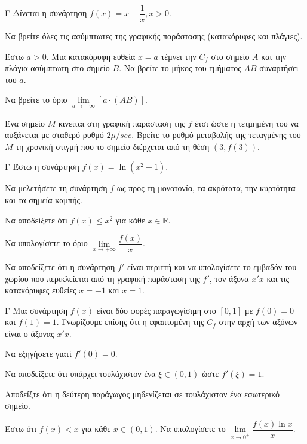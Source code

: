 \begin{thema}{Γ}
Δίνεται η συνάρτηση $f(x) = x + \dfrac{1}{x}, x > 0$.
\begin{erwthma}
  \item Να βρείτε όλες τις ασύμπτωτες της γραφικής παράστασης (κατακόρυφες και πλάγιες).
  \item Έστω $a > 0$. Μια κατακόρυφη ευθεία $x = a$ τέμνει την $C_f$ στο σημείο $A$ και την πλάγια ασύμπτωτη στο σημείο $B$. Να βρείτε το μήκος του τμήματος $AB$ συναρτήσει του $a$.
  \item Να βρείτε το όριο $\lim\limits_{a \to +\infty} [a \cdot (AB)]$.
  \item Ένα σημείο $M$ κινείται στη γραφική παράσταση της $f$ έτσι ώστε η τετμημένη του να αυξάνεται με σταθερό ρυθμό $2\mu/\si{sec}$. Βρείτε το ρυθμό μεταβολής της τεταγμένης του $M$ τη χρονική στιγμή που το σημείο διέρχεται από τη θέση $(3,f(3))$.
\end{erwthma}
\end{thema}

\begin{thema}{Γ}
Έστω η συνάρτηση $f(x) = \ln(x^2 + 1)$.
\begin{erwthma}
  \item Να μελετήσετε τη συνάρτηση $f$ ως προς τη μονοτονία, τα ακρότατα, την κυρτότητα και τα σημεία καμπής.
  \item Να αποδείξετε ότι $f(x) \le x^2$ για κάθε $x \in \mathbb{R}$.
  \item Να υπολογίσετε το όριο $\lim\limits_{x \to +\infty} \dfrac{f(x)}{x}$.
  \item Να αποδείξετε ότι η συνάρτηση $f'$ είναι περιττή και να υπολογίσετε το εμβαδόν του χωρίου που περικλείεται από τη γραφική παράσταση της $f'$, τον άξονα $x'x$ και τις κατακόρυφες ευθείες $x=-1$ και $x=1$.
\end{erwthma}
\end{thema}

\begin{thema}{Γ}
Μια συνάρτηση $f(x)$ είναι δύο φορές παραγωγίσιμη στο $[0, 1]$ με $f(0)=0$ και $f(1)=1$. Γνωρίζουμε επίσης ότι η εφαπτομένη της $C_f$ στην αρχή των αξόνων είναι ο άξονας $x'x$.
\begin{erwthma}
  \item Να εξηγήσετε γιατί $f'(0) = 0$.
  \item Να αποδείξετε ότι υπάρχει τουλάχιστον ένα $\xi \in (0, 1)$ ώστε $f'(\xi) = 1$.
  \item Αποδείξτε ότι η δεύτερη παράγωγος μηδενίζεται σε τουλάχιστον ένα εσωτερικό σημείο.
  \item Έστω ότι $f(x) < x$ για κάθε $x \in (0, 1)$. Να υπολογίσετε το $\lim\limits_{x \to 0^+} \dfrac{f(x) \ln x}{x}$.
\end{erwthma}
\end{thema}


